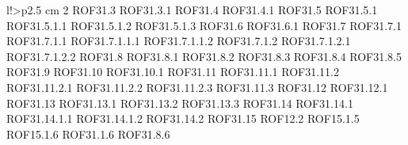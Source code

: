 \begin{tabella}{l!{\VRule}>{\centering\arraybackslash}p{2.5 cm}}
2 \linebreak ROF31.3 \linebreak ROF31.3.1 \linebreak ROF31.4 \linebreak ROF31.4.1 \linebreak ROF31.5 \linebreak ROF31.5.1 \linebreak ROF31.5.1.1 \linebreak ROF31.5.1.2 \linebreak ROF31.5.1.3 \linebreak ROF31.6 \linebreak ROF31.6.1 \linebreak ROF31.7 \linebreak ROF31.7.1 \linebreak ROF31.7.1.1 \linebreak ROF31.7.1.1.1 \linebreak ROF31.7.1.1.2 \linebreak ROF31.7.1.2 \linebreak ROF31.7.1.2.1 \linebreak ROF31.7.1.2.2 \linebreak ROF31.8 \linebreak ROF31.8.1 \linebreak ROF31.8.2 \linebreak ROF31.8.3 \linebreak ROF31.8.4 \linebreak ROF31.8.5 \linebreak ROF31.9 \linebreak ROF31.10 \linebreak ROF31.10.1 \linebreak ROF31.11 \linebreak ROF31.11.1 \linebreak ROF31.11.2 \linebreak ROF31.11.2.1 \linebreak ROF31.11.2.2 \linebreak ROF31.11.2.3 \linebreak ROF31.11.3 \linebreak ROF31.12 \linebreak ROF31.12.1 \linebreak ROF31.13 \linebreak ROF31.13.1 \linebreak ROF31.13.2 \linebreak ROF31.13.3 \linebreak ROF31.14 \linebreak ROF31.14.1 \linebreak ROF31.14.1.1 \linebreak ROF31.14.1.2 \linebreak ROF31.14.2 \linebreak ROF31.15 \linebreak ROF12.2 \linebreak ROF15.1.5 \linebreak ROF15.1.6 \linebreak ROF31.1.6 \linebreak ROF31.8.6 \\

\end{tabella}
